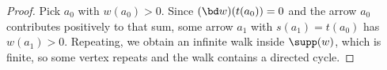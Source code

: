 \begin{proof}
Pick $a_{0}$ with $w(a_{0}) > 0$. Since $(\bd w)(t(a_{0})) = 0$ and the arrow $a_{0}$ contributes positively to that sum, some arrow $a_{1}$ with $s(a_{1}) = t(a_{0})$ has $w(a_{1}) > 0$. Repeating, we obtain an infinite walk inside $\supp(w)$, which is finite, so some vertex repeats and the walk contains a directed cycle.
\end{proof}